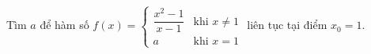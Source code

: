\begin{ex}
Tìm $a$ để hàm số $f(x)=\begin{cases}\dfrac{x^2-1}{x-1}&\text{khi }x\ne1\\a&\text{khi }x=1\end{cases}$ liên tục tại điểm $x_0=1$.
\end{ex}

